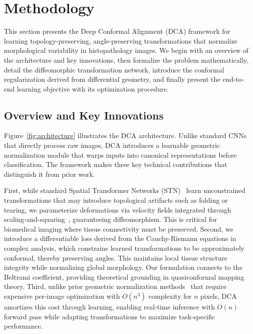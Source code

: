 \section{Methodology}
\label{sec:method}

This section presents the Deep Conformal Alignment (DCA) framework for learning topology-preserving, angle-preserving transformations that normalize morphological variability in histopathology images. We begin with an overview of the architecture and key innovations, then formalize the problem mathematically, detail the diffeomorphic transformation network, introduce the conformal regularization derived from differential geometry, and finally present the end-to-end learning objective with its optimization procedure.

\subsection{Overview and Key Innovations}
\label{subsec:overview}

Figure~\ref{fig:architecture} illustrates the DCA architecture. Unlike standard CNNs that directly process raw images, DCA introduces a learnable geometric normalization module that warps inputs into canonical representations before classification. The framework makes three key technical contributions that distinguish it from prior work.

First, while standard Spatial Transformer Networks (STN)~\cite{jaderberg2015spatial} learn unconstrained transformations that may introduce topological artifacts such as folding or tearing, we parameterize deformations via velocity fields integrated through scaling-and-squaring~\cite{arsigny2006logdiff}, guaranteeing diffeomorphism. This is critical for biomedical imaging where tissue connectivity must be preserved. Second, we introduce a differentiable loss derived from the Cauchy-Riemann equations in complex analysis, which constrains learned transformations to be approximately conformal, thereby preserving angles. This maintains local tissue structure integrity while normalizing global morphology. Our formulation connects to the Beltrami coefficient, providing theoretical grounding in quasiconformal mapping theory. Third, unlike prior geometric normalization methods~\cite{huang2024surface} that require expensive per-image optimization with $O(n^3)$ complexity for $n$ pixels, DCA amortizes this cost through learning, enabling real-time inference with $O(n)$ forward pass while adapting transformations to maximize task-specific performance.

